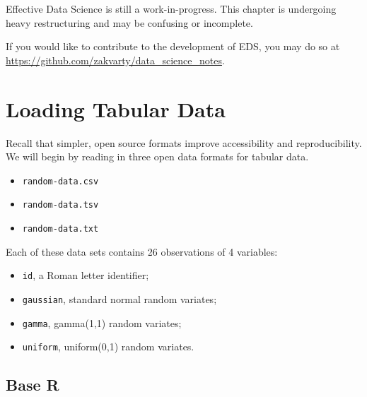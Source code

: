 \documentclass[
  letterpaper,
  DIV=11,
  numbers=noendperiod]{scrreprt}
\providecommand{\tightlist}{%
  \setlength{\itemsep}{0pt}\setlength{\parskip}{0pt}}\usepackage{longtable,booktabs,array}
\begin{document}
\begin{tcolorbox}[enhanced jigsaw, coltitle=black, opacityback=0, left=2mm, titlerule=0mm, breakable, colback=white, opacitybacktitle=0.6, colbacktitle=quarto-callout-important-color!10!white, bottomtitle=1mm, toptitle=1mm, colframe=quarto-callout-important-color-frame, bottomrule=.15mm, leftrule=.75mm, title=\textcolor{quarto-callout-important-color}{\faExclamation}\hspace{0.5em}{Important}, toprule=.15mm, arc=.35mm, rightrule=.15mm]

Effective Data Science is still a work-in-progress. This chapter is
undergoing heavy restructuring and may be confusing or incomplete.

If you would like to contribute to the development of EDS, you may do so
at \url{https://github.com/zakvarty/data_science_notes}.

\end{tcolorbox}

\section{Loading Tabular Data}\label{loading-tabular-data}

Recall that simpler, open source formats improve accessibility and
reproducibility. We will begin by reading in three open data formats for
tabular data.

\begin{itemize}
\item
  \texttt{random-data.csv}
\item
  \texttt{random-data.tsv}
\item
  \texttt{random-data.txt}
\end{itemize}

Each of these data sets contains 26 observations of 4 variables:

\begin{itemize}
\tightlist
\item
  \texttt{id}, a Roman letter identifier;
\item
  \texttt{gaussian}, standard normal random variates;
\item
  \texttt{gamma}, gamma(1,1) random variates;
\item
  \texttt{uniform}, uniform(0,1) random variates.
\end{itemize}

\subsection{Base R}\label{base-r}
\end{document}
